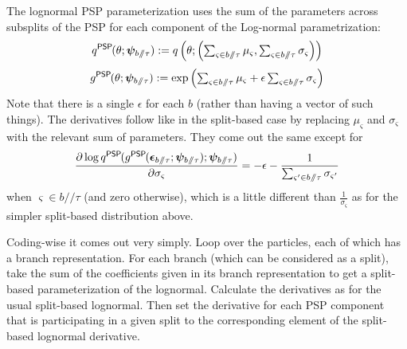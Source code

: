 \documentclass{article}
\newcommand{\psp}{\slash\!\!\slash}
\newcommand{\qPSP}{q^\textsf{PSP}\hspace{-1pt}}
\newcommand{\gPSP}{g^\textsf{PSP}\hspace{-1pt}}
\begin{document}
The lognormal PSP parameterization uses the sum of the parameters across subsplits of the PSP for each component of the Log-normal parametrization:
\[
\qPSP(\theta; \bm\psi_{b \psp \tau}) :=
q\left(\theta; \left(
        \textstyle\sum_{\varsigma \in b \psp \tau} \mu_\varsigma,
        \textstyle\sum_{\varsigma \in b \psp \tau} \sigma_\varsigma
    \right)\right)
\]
\[
\gPSP(\theta; \bm\psi_{b \psp \tau}) :=
    \exp \left(
        \textstyle\sum_{\varsigma \in b \psp \tau} \mu_\varsigma +
        \epsilon
        \textstyle\sum_{\varsigma \in b \psp \tau} \sigma_\varsigma
    \right)
\]
Note that there is a single $\epsilon$ for each $b$ (rather than having a vector of such things).
The derivatives follow like in the split-based case by replacing $\mu_\varsigma$ and $\sigma_\varsigma$ with the relevant sum of parameters.
They come out the same except for
\[
    \frac
    {\partial \log \qPSP(\gPSP(\bm\epsilon_{b \psp \tau}; \bm\psi_{b \psp \tau}); \bm\psi_{b \psp \tau})}
    {\partial \sigma_{\varsigma}}
    =
    - \epsilon
    - \frac{1}{\textstyle\sum_{\varsigma' \in b \psp \tau} \sigma_{\varsigma'}}
\]
when $\varsigma \in b \psp \tau$ (and zero otherwise), which is a little different than $\frac{1}{\sigma_\varsigma}$ as for the simpler split-based distribution above.

Coding-wise it comes out very simply.
Loop over the particles, each of which has a branch representation.
For each branch (which can be considered as a split), take the sum of the coefficients given in its branch representation to get a split-based parameterization of the lognormal.
Calculate the derivatives as for the usual split-based lognormal.
Then set the derivative for each PSP component that is participating in a given split to the corresponding element of the split-based lognormal derivative.


\nocite{vbpi}



\end{document}
